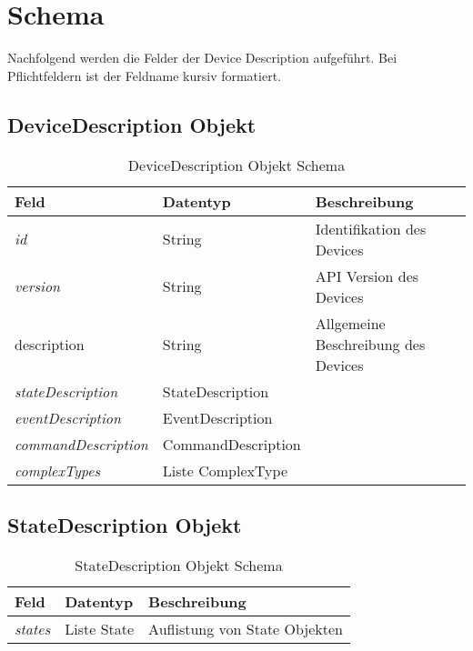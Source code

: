 \section{Schema}

Nachfolgend werden die Felder der Device Description aufgeführt. Bei Pflichtfeldern ist der Feldname kursiv formatiert.

\subsection{DeviceDescription Objekt}

\begin{table}[H]
\begin{tabularx}{\textwidth}{|l|l|X|}

 \hline \rowcolor{lightgray}
 {\bf Feld } & {\bf Datentyp } & {\bf Beschreibung } \\  \hline

 \textit{id}  &   String   & Identifikation des Devices   \\ \hline

 \textit{version} & String & API Version des Devices \\ \hline

 description & String & Allgemeine Beschreibung des Devices \\ \hline 
 
 \textit{stateDescription}  &   StateDescription    &     \\ \hline
 
 \textit{eventDescription}  &   EventDescription    &     \\ \hline
  
 \textit{commandDescription}  &   CommandDescription    &     \\ \hline
 
 \textit{complexTypes}  &   Liste ComplexType    &     \\ \hline
 
\end{tabularx}
\caption{DeviceDescription Objekt Schema}
\end{table}

\subsection{StateDescription Objekt}
\begin{table}[H]
\begin{tabularx}{\textwidth}{|l|l|X|}

 \hline \rowcolor{lightgray}
 {\bf Feld } & {\bf Datentyp } & {\bf Beschreibung } \\  \hline

 \textit{states}  &   Liste State   & Auflistung von State Objekten   \\ \hline

\end{tabularx}
\caption{StateDescription Objekt Schema}
\end{table}


